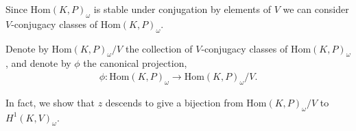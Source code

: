 
Since $\mathrm{Hom}(K, P)_\omega$ is stable under conjugation by elements of $V$ we can consider $V$-conjugacy classes of $\mathrm{Hom}(K, P)_\omega$.
\begin{definition} Denote by $\mathrm{Hom}(K, P)_\omega / V$ the collection of $V$-conjugacy classes of $\mathrm{Hom}(K, P)_\omega$, and denote by $\phi$ the canonical projection,
\begin{align*} \phi : \mathrm{Hom}(K, P)_\omega \rightarrow \mathrm{Hom}(K, P)_\omega / V. \end{align*}
\end{definition}

In fact, we show that $z$ descends to give a bijection from $\mathrm{Hom}(K, P)_\omega / V$ to $H^1(K, V)_\omega$.

